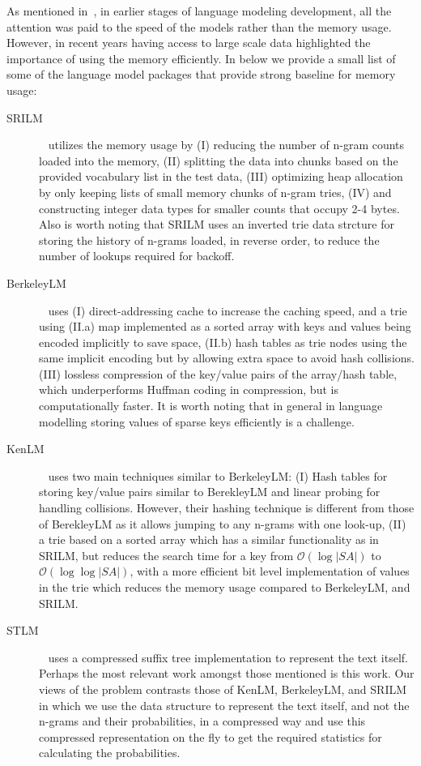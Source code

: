 \documentclass[11pt]{article}
\begin{document}
As mentioned in~\citep{stolcke2011srilm}, in earlier stages of language modeling development, all the attention was paid to the speed of the models rather than the memory usage. However, in recent years having access to large scale data highlighted the importance of using the memory efficiently. In below we provide a small list of some of the language model packages that provide strong baseline for memory usage:
\begin{description}
\item [SRILM]~\citep{stolcke2002srilm} utilizes the memory usage by (I) reducing the number of n-gram counts loaded into the memory, (II) splitting the data into chunks based on the provided vocabulary list in the test data, (III) optimizing heap allocation by only keeping lists of small memory chunks of n-gram tries, (IV) and constructing integer data types for smaller counts that occupy 2-4 bytes. Also is worth noting that SRILM uses an inverted trie data strcture for storing the history of n-grams loaded, in reverse order, to reduce the number of lookups required for backoff.   
\item [BerkeleyLM]~\citep{pauls2011faster} uses (I) direct-addressing cache to increase the caching speed, and a trie using (II.a) map implemented as a sorted array with keys and values being encoded implicitly to save space, (II.b) hash tables as trie nodes using the same implicit encoding but by allowing extra space to avoid hash collisions. (III) lossless compression of the key/value pairs of the array/hash table, which underperforms Huffman coding in compression, but is computationally faster. It is worth noting that in general in language modelling storing values of sparse keys efficiently is a challenge.      
\item [KenLM]~\citep{heafield2011kenlm} uses two main techniques similar to BerkeleyLM: (I) Hash tables for storing key/value pairs similar to BerekleyLM and linear probing for handling collisions. However, their hashing technique is different from those of BerekleyLM as it allows jumping to any n-grams with one look-up,  (II) a trie based on a sorted array which has a similar functionality as in SRILM, but reduces the search time for a key from $\mathcal{O}(\log |SA|)$ to $\mathcal{O}(\log\log|SA|)$,  with a more efficient bit level implementation of values in the trie which reduces the memory usage compared to BerkeleyLM, and SRILM.

\item [STLM]~\citep{kennington2012suffix} uses a compressed suffix tree implementation to represent the text itself. Perhaps the most relevant work amongst those mentioned is this work. Our views of the problem contrasts those of KenLM, BerkeleyLM, and SRILM in which we use the data structure to represent the text itself, and not the n-grams and their probabilities, in a compressed way and use this compressed representation on the fly to get the required statistics for calculating the probabilities.
\end{description}
\end{document}
